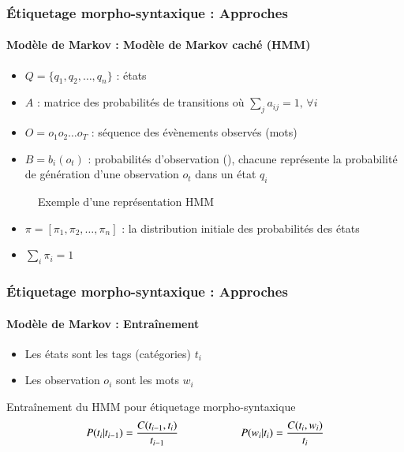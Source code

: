 \documentclass[xcolor=table]{beamer}
\begin{document}
\begin{frame}[fragile]
\frametitle{Étiquetage morpho-syntaxique : Approches}
\framesubtitle{Modèle de Markov : Modèle de Markov caché (HMM)}

\begin{minipage}{.54\textwidth}
	\begin{itemize}
		\item $Q = \{q_1, q_2, \ldots, q_n\}$ : états
		\item $A$ : matrice des probabilités de transitions où $\sum_j a_{ij} = 1,\, \forall i$
		\item $O = o_1 o_2 \ldots o_T$ : séquence des évènements observés (mots)
		\item $B = b_i(o_t)$ : probabilités d'observation (), chacune représente la probabilité de génération d'une observation $o_t$ dans un état $q_i$
	\end{itemize}
\end{minipage}
\begin{minipage}{.45\textwidth}
	\begin{figure}
		\caption{Exemple d'une représentation HMM \cite{2019-jurafsky-martin}}
	\end{figure}
\end{minipage}

\begin{itemize}
	\item $\pi = [\pi_1, \pi_2, \ldots, \pi_n ]$ : la distribution initiale des probabilités des états
	\item $\sum_i \pi_i = 1$
\end{itemize}

\end{frame}

\begin{frame}
\frametitle{Étiquetage morpho-syntaxique : Approches}
\framesubtitle{Modèle de Markov : Entraînement}

\begin{itemize}
	\item Les états sont les tags (catégories) $t_i$
	\item Les observation $o_i$ sont les mots $w_i$
\end{itemize}

\begin{block}{Entraînement du HMM pour étiquetage morpho-syntaxique}
	\[
	P(t_i | t_{i-1}) = \frac{C(t_{i-1}, t_i)}{t_{i-1}} 
	\hskip2cm
	P(w_i | t_i) = \frac{C(t_i, w_i)}{t_i}
	\]
	
\end{block}

\end{frame}
\end{document}
